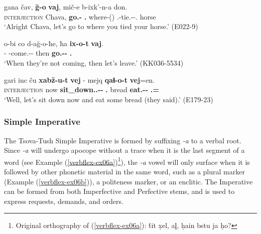 \begin{exe}
	\ex\label{verbflex-ex05}
	\begin{xlist}
		
		\ex\label{verbflex-ex05a}
		\gll gana čav, \textbf{\u{g}-o} \textbf{vaj}, mič-e b-ixk'-n-a don. \\
		\textsc{interjection}	 Chava, \textbf{go.{\Pfv}-{\Npst}} \textbf{{\Fpl}.{\Incl}} where-{\Rel}({\Ess}) {\B}.{\Sg}-tie.{\Ipfv}-{\Aor}-{\Ssg}.{\Erg} horse \\
		\trans `Alright Chava, let's go to where you tied your horse.'
		\hfill (E022-9)
		
		\ex\label{verbflex-ex05b}
		\gll o-bi co d-a\u{g}-o-ħe, ħa \textbf{ix-o-t} \textbf{vaj}. \\
		{\Dist}-{\Pl} {\Neg} {\D}-come.{\Ipfv}-{\Npst}-{\Cond} then \textbf{go.{\Ipfv}-{\Npst}-{\Pl}} \textbf{{\Fpl}.{\Incl}} \\
		\trans `When they're not coming, then let's leave.'
		\hfill (KK036-5534)
		
		\ex\label{verbflex-ex05c}
		\gll gari inc ču \textbf{xabž-u-t} \textbf{vej} - mejq \textbf{qaɬ-o-t} \textbf{vej}=en. \\
		\textsc{interjection} now {\Pv} \textbf{sit\_down.{\Pfv}.{\Pl}-{\Npst}-{\Pl}} \textbf{{\Fpl}.{\Incl}} {} bread \textbf{eat.{\Pfv}-{\Npst}-{\Pl}} \textbf{{\Fpl}.{\Incl}={\Quot}} \\
		\trans `Well, let's sit down now and eat some bread (they said).'
		\hfill (E179-23)
		
	\end{xlist}
\end{exe}

\subsubsection{Simple Imperative}

The Tsova-Tush Simple Imperative is formed by suffixing \textit{-a} to a verbal root. Since \textit{-a} will undergo apocope without a trace when it is the last segment of a word (see Example (\ref{verbflex-ex06a})\footnote{Original orthography of (\ref{verbflex-ex06a}): \'{t}it x̣el, aḽ, ḥain bstu ja ḥo?}), the \textit{-a} vowel will only surface when it is followed by other phonetic material in the same word, such as a plural marker (Example (\ref{verbflex-ex06b})), a politeness marker, or an enclitic. The Imperative can be formed from both Imperfective and Perfective stems, and is used to express requests, demands, and orders.

